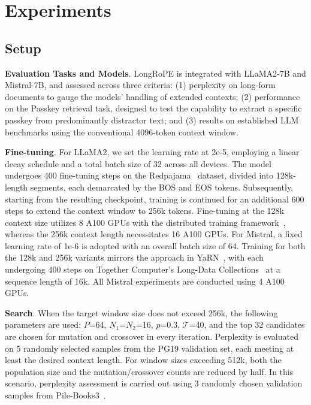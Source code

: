  \section{Experiments}

\label{sec:exp}
\subsection{Setup}
\textbf{Evaluation Tasks and Models}. LongRoPE is integrated with LLaMA2-7B and Mistral-7B, and assessed across three criteria: (1) perplexity on long-form documents to gauge the models' handling of extended contexts; (2) performance on the Passkey retrieval task, designed to test the capability to extract a specific passkey from predominantly distractor text; and (3) results on established LLM benchmarks using the conventional 4096-token context window.

\textbf{Fine-tuning}. For LLaMA2, we set the learning rate at 2e-5, employing a linear decay schedule and a total batch size of 32 across all devices. The model undergoes 400 fine-tuning steps on the Redpajama~\cite{redpajama} dataset, divided into 128k-length segments, each demarcated by the BOS and EOS tokens. Subsequently, starting from the resulting checkpoint, training is continued for an additional 600 steps to extend the context window to 256k tokens. Fine-tuning at the 128k context size utilizes 8 A100 GPUs with the distributed training framework~\cite{cube}, whereas the 256k context length necessitates 16 A100 GPUs. For Mistral, a fixed learning rate of 1e-6 is adopted with an overall batch size of 64. Training for both the 128k and 256k variants mirrors the approach in YaRN~\cite{yarn}, with each undergoing 400 steps on Together Computer's Long-Data Collections~\cite{mistraldata} at a sequence length of 16k. All Mistral experiments are conducted using 4 A100 GPUs.

\textbf{Search}. When the target window size does not exceed 256k, the following parameters are used: $P$=64, $N_1$=$N_2$=16, $p$=0.3, $\mathcal{T}$=40, and the top 32 candidates are chosen for mutation and crossover in every iteration. Perplexity is evaluated on 5 randomly selected samples from the PG19 validation set, each meeting at least the desired context length. For window sizes exceeding 512k, both the population size and the mutation/crossover counts are reduced by half. In this scenario, perplexity assessment is carried out using 3 randomly chosen validation samples from Pile-Books3~\cite{pile}.

